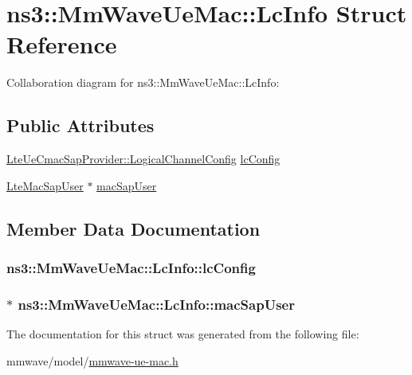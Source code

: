 \hypertarget{structns3_1_1MmWaveUeMac_1_1LcInfo}{}\section{ns3\+:\+:Mm\+Wave\+Ue\+Mac\+:\+:Lc\+Info Struct Reference}
\label{structns3_1_1MmWaveUeMac_1_1LcInfo}


Collaboration diagram for ns3\+:\+:Mm\+Wave\+Ue\+Mac\+:\+:Lc\+Info\+:
\subsection*{Public Attributes}
\begin{DoxyCompactItemize}
\item 
\hyperlink{structns3_1_1LteUeCmacSapProvider_1_1LogicalChannelConfig}{Lte\+Ue\+Cmac\+Sap\+Provider\+::\+Logical\+Channel\+Config} \hyperlink{structns3_1_1MmWaveUeMac_1_1LcInfo_ab6d205a7b77b2cace5506f657b7a3438}{lc\+Config}
\item 
\hyperlink{classns3_1_1LteMacSapUser}{Lte\+Mac\+Sap\+User} $\ast$ \hyperlink{structns3_1_1MmWaveUeMac_1_1LcInfo_aaab0a762859355a5edba616c5d45c848}{mac\+Sap\+User}
\end{DoxyCompactItemize}


\subsection{Member Data Documentation}
\subsubsection[{\texorpdfstring{lc\+Config}{lcConfig}}]{ ns3\+::\+Mm\+Wave\+Ue\+Mac\+::\+Lc\+Info\+::lc\+Config}\hypertarget{structns3_1_1MmWaveUeMac_1_1LcInfo_ab6d205a7b77b2cace5506f657b7a3438}{}\label{structns3_1_1MmWaveUeMac_1_1LcInfo_ab6d205a7b77b2cace5506f657b7a3438}
\subsubsection[{\texorpdfstring{mac\+Sap\+User}{macSapUser}}]{$\ast$ ns3\+::\+Mm\+Wave\+Ue\+Mac\+::\+Lc\+Info\+::mac\+Sap\+User}\hypertarget{structns3_1_1MmWaveUeMac_1_1LcInfo_aaab0a762859355a5edba616c5d45c848}{}\label{structns3_1_1MmWaveUeMac_1_1LcInfo_aaab0a762859355a5edba616c5d45c848}


The documentation for this struct was generated from the following file\+:\begin{DoxyCompactItemize}
\item 
mmwave/model/\hyperlink{mmwave-ue-mac_8h}{mmwave-\/ue-\/mac.\+h}\end{DoxyCompactItemize}

